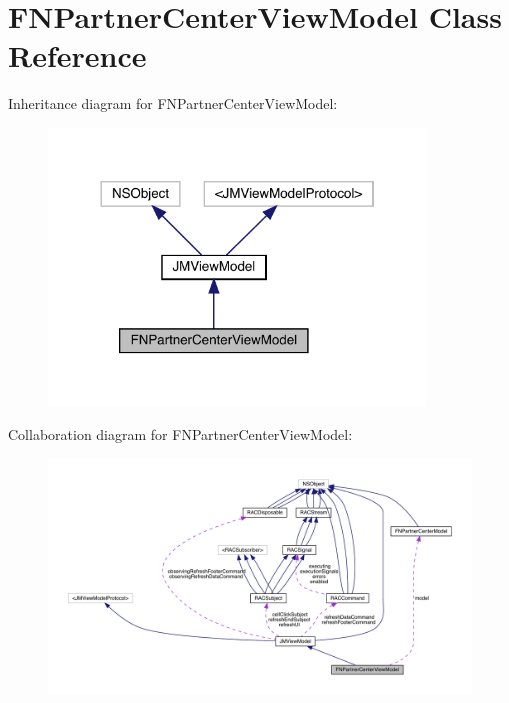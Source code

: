\hypertarget{interface_f_n_partner_center_view_model}{}\section{F\+N\+Partner\+Center\+View\+Model Class Reference}
\label{interface_f_n_partner_center_view_model}


Inheritance diagram for F\+N\+Partner\+Center\+View\+Model\+:\nopagebreak
\begin{figure}[H]
\begin{center}
\leavevmode
\includegraphics[width=284pt]{interface_f_n_partner_center_view_model__inherit__graph}
\end{center}
\end{figure}


Collaboration diagram for F\+N\+Partner\+Center\+View\+Model\+:\nopagebreak
\begin{figure}[H]
\begin{center}
\leavevmode
\includegraphics[width=350pt]{interface_f_n_partner_center_view_model__coll__graph}
\end{center}
\end{figure}

